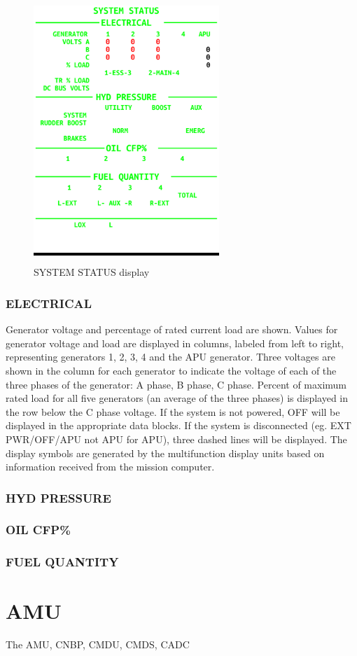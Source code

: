 \begin{figure}[h]
  \centering
  \colorbox{black}{\includegraphics[width=7cm]{figures/hdd/SYSTEM-STATUS}}
  \caption{SYSTEM STATUS display}
\end{figure}

\subsection*{ELECTRICAL}
Generator voltage and percentage of rated current load are shown. Values for generator voltage and load are displayed in columns, labeled from left to right, representing generators 1, 2, 3, 4 and the APU generator. Three voltages are shown in the column for each generator to indicate the voltage of each of the three phases of the generator: A phase, B phase, C phase. Percent of maximum rated load for all five generators (an average of the three phases) is displayed in the row below the C phase voltage. If the system is not powered, OFF will be displayed in the appropriate data blocks. If the system is disconnected (eg. EXT PWR/OFF/APU not APU for APU), three dashed lines will be displayed. The display symbols are generated by the multifunction display units based on information received from the mission computer. 

\subsection*{HYD PRESSURE}

\subsection*{OIL CFP\%}

\subsection*{FUEL QUANTITY}

\chapter{AMU}
\label{chap:amu}

The \gls{AMU}, \gls{CNBP}, \gls{CMDU}, \gls{CMDS}, \gls{CADC}
